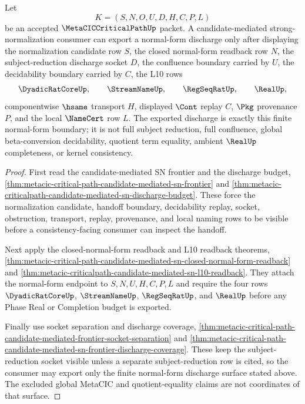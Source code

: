 \begin{theorem}
\label{thm:metacic-critical-path-candidate-mediated-frontier-normal-form-discharge}
Let
$$
K=(S,N,O,U,D,H,C,P,L)
$$
be an accepted $\MetaCICCriticalPathUp$ packet. A candidate-mediated strong-normalization consumer can export a normal-form discharge only after displaying the normalization candidate row $S$, the closed normal-form readback row $N$, the subject-reduction discharge socket $D$, the confluence boundary carried by $U$, the decidability boundary carried by $C$, the L10 rows
$$
\DyadicRatCoreUp,\qquad
\StreamNameUp,\qquad
\RegSeqRatUp,\qquad
\RealUp ,
$$
componentwise $\hsame$ transport $H$, displayed $\Cont$ replay $C$, $\Pkg$ provenance $P$, and the local $\NameCert$ row $L$. The exported discharge is exactly this finite normal-form boundary; it is not full subject reduction, full confluence, global beta-conversion decidability, quotient term equality, ambient $\RealUp$ completeness, or kernel consistency.
\end{theorem}
\begin{proof}
First read the candidate-mediated SN frontier and the discharge budget, \autoref{thm:metacic-critical-path-candidate-mediated-sn-frontier} and \autoref{thm:metacic-criticalpath-candidate-mediated-sn-discharge-budget}. These force the normalization candidate, handoff boundary, decidability replay, socket, obstruction, transport, replay, provenance, and local naming rows to be visible before a consistency-facing consumer can inspect the handoff.

Next apply the closed-normal-form readback and L10 readback theorems, \autoref{thm:metacic-critical-path-candidate-mediated-sn-closed-normal-form-readback} and \autoref{thm:metacic-criticalpath-candidate-mediated-sn-l10-readback}. They attach the normal-form endpoint to $S,N,U,H,C,P,L$ and require the four rows $\DyadicRatCoreUp$, $\StreamNameUp$, $\RegSeqRatUp$, and $\RealUp$ before any Phase Real or Completion budget is exported.

Finally use socket separation and discharge coverage, \autoref{thm:metacic-critical-path-candidate-mediated-frontier-socket-separation} and \autoref{thm:metacic-critical-path-candidate-mediated-sn-frontier-discharge-coverage}. These keep the subject-reduction socket visible unless a separate subject-reduction row is cited, so the consumer may export only the finite normal-form discharge surface stated above. The excluded global MetaCIC and quotient-equality claims are not coordinates of that surface.
\end{proof}

